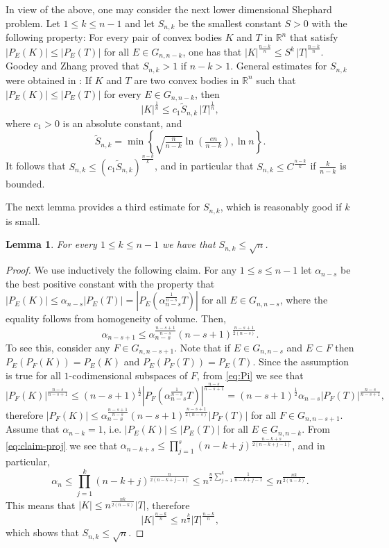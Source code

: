 \documentclass[11pt,leqno]{article}
\newtheorem{lemma}[theorem]{Lemma}
\theoremstyle{definition}
\theoremstyle{remark}
\numberwithin{equation}{section}
\newcommand{\ls}{\leqslant}
\newcommand{\1}{\textbf{1}}
\begin{document}
In view of the above, one may consider the next lower dimensional Shephard problem. Let $1\ls k\ls n-1$
and let $S_{n,k}$ be the smallest constant $S >0$ with the following property: For
every pair of convex bodies $K$ and $T$ in ${\mathbb R}^n$ that satisfy
$|P_E(K)|\ls |P_E(T)|$ for all $E\in G_{n,n-k}$, one has that $|K|^{\frac{n-k}{n}}\ls S^k\,|T|^{\frac{n-k}{n}}$.
Goodey and Zhang \cite{GZ} proved that $S_{n,k}>1$ if $n-k>1$. General estimates for $S_{n,k}$ were
obtained in \cite{Giannopoulos-Koldobsky-2017}: If $K$ and $T$ are two convex bodies in ${\mathbb R}^n$ such that
$|P_E(K)|\ls |P_E(T)|$ for every $E\in G_{n,n-k}$, then
\begin{equation*}|K|^{\frac{1}{n}}\ls c_1\tilde{S}_{n,k}\,|T|^{\frac{1}{n}},\end{equation*}
where $c_1>0$ is an absolute constant, and
$$\tilde{S}_{n,k}=\min\left\{\sqrt{\tfrac{n}{n-k}}\ln\left (\tfrac{en}{n-k}\right),\ln n\right\}.$$
It follows that $S_{n,k}\ls (c_1\tilde{S}_{n,k})^{\frac{n-k}{k}}$, and in particular that $S_{n,k}\ls C^{\frac{n-k}{k}}$
if $\frac{k}{n-k}$ is bounded.

The next lemma provides a third estimate for $S_{n,k}$, which is reasonably good if $k$ is small.

\begin{lemma}\label{lem:third-estimate}For every $1\ls k\ls n-1$ we have that $S_{n,k}\ls \sqrt{n}$.
\end{lemma}

\begin{proof}We use inductively the following claim. For any $1\ls s\ls n-1$ let ${\alpha}_{n-s}$ be the best
positive constant with the property that $|P_E(K)|\ls\alpha_{n-s} |P_E(T)|=
|P_E(\alpha_{n-s}^{\frac{1}{n-s}}T)|$ for all $E\in G_{n,n-s}$, where the equality follows from homogeneity of volume. Then,
\begin{equation}\label{eq:claim-proj}{\alpha}_{n-s+1}\ls \alpha_{n-s}^{\frac{n-s+1}{n-s}}(n-s+1)^{\frac{n-s+1}{2(n-s)}}.\end{equation}
To see this, consider any $F\in G_{n,n-s+1}$. Note that if $E\in G_{n,n-s}$ and $E\subset F$ then
$P_E(P_F(K))=P_E(K)$ and $P_E(P_F(T))=P_E(T)$. Since the assumption is true for all $1$-codimensional subspaces
of $F$, from \eqref{eq:Pi} we see that
$$|P_F(K)|^{\frac{n-s}{n-s+1}}\ls (n-s+1)^{\frac{1}{2}}|P_F(\alpha_{n-s}^{\frac{1}{n-s}}T)|^{\frac{n-s}{n-s+1}}=(n-s+1)^{\frac{1}{2}}
\alpha_{n-s}|P_F(T)|^{\frac{n-s}{n-s+1}},$$
therefore $|P_F(K)|\ls\alpha_{n-s}^{\frac{n-s+1}{n-s}}(n-s+1)^{\frac{n-s+1}{2(n-s)}}|P_F(T)|$ for all $F\in G_{n,n-s+1}$.
Assume that ${\alpha}_{n-k}=1$, i.e. $|P_E(K)|\ls |P_E(T)|$ for all $E\in G_{n,n-k}$. From \eqref{eq:claim-proj} we see that
$\alpha_{n-k+s}\ls\prod_{j=1}^{s}(n-k+j)^{\frac{n-k+s}{2(n-k+j-1)}}$, and in particular,
$${\alpha}_n\ls\prod_{j=1}^k(n-k+j)^{\frac{n}{2(n-k+j-1)}}\ls n^{\frac{n}{2}\sum_{j=1}^k\frac{1}{n-k+j-1}}\ls n^{\frac{nk}{2(n-k)}}.$$
This means that $|K|\ls n^{\frac{nk}{2(n-k)}}|T|$, therefore
$$|K|^{\frac{n-k}{n}}\ls n^{\frac{k}{2}}|T|^{\frac{n-k}{n}},$$
which shows that $S_{n,k}\ls\sqrt{n}$.
\end{proof}
\end{document}

